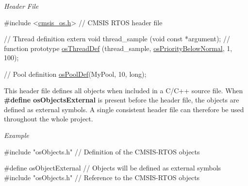 {\itshape Header File} 
\begin{DoxyCode}
\textcolor{preprocessor}{#include <\mbox{\hyperlink{cmsis__os_8h}{cmsis\_os.h}}>}                                         \textcolor{comment}{// CMSIS RTOS header file}

\textcolor{comment}{// Thread definition}
\textcolor{keyword}{extern} \textcolor{keywordtype}{void} thread\_sample (\textcolor{keywordtype}{void} \textcolor{keyword}{const} *argument);             \textcolor{comment}{// function prototype}
\mbox{\hyperlink{cmsis__os_8h_a1537e80813785bebbc3cbab3226eb04f}{osThreadDef}} (thread\_sample, \mbox{\hyperlink{cmsis__os_8h_a7f2b42f1983b9107775ec2a1c69a849aa193b650117c209b4a203954542bcc3e6}{osPriorityBelowNormal}}, 1, 100);

\textcolor{comment}{// Pool definition}
\mbox{\hyperlink{cmsis__os_8h_a87b471d4fe2d5dbd0040708edd52771b}{osPoolDef}}(MyPool, 10, \textcolor{keywordtype}{long});
\end{DoxyCode}


This header file defines all objects when included in a C/\+C++ source file. When {\bfseries \#define os\+Objects\+External} is present before the header file, the objects are defined as external symbols. A single consistent header file can therefore be used throughout the whole project.

{\itshape Example} 
\begin{DoxyCode}
\textcolor{preprocessor}{#include "osObjects.h"}     \textcolor{comment}{// Definition of the CMSIS-RTOS objects}
\end{DoxyCode}



\begin{DoxyCode}
\textcolor{preprocessor}{#define osObjectExternal   // Objects will be defined as external symbols}
\textcolor{preprocessor}{#include "osObjects.h"     // Reference to the CMSIS-RTOS objects}
\end{DoxyCode}
 